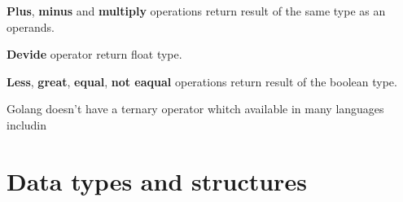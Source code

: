 \documentclass[12pt]{article}
\begin{document}
\begin{multicols}{2}
    \textbf{Plus}, \textbf{minus} and \textbf{multiply} operations return
    result of the same type as an operands.

    \textbf{Devide} operator return float type.

    \textbf{Less}, \textbf{great}, \textbf{equal}, \textbf{not eaqual} operations return result of the boolean type.

    Golang doesn't have a ternary operator whitch available in many languages includin

\end{multicols}

\newpage
\section{Data types and structures}
\label{sec:data-types-and-structures}
\end{document}
